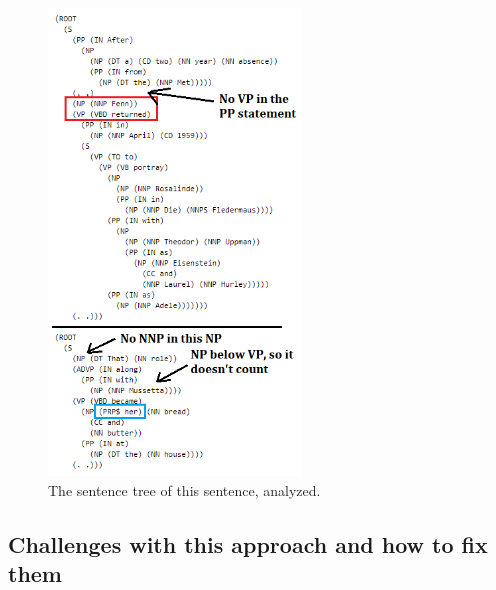\documentclass{article}
\begin{document}
\begin{figure}[H]
    \centering
\includegraphics[width=0.6\textwidth]{Example2.png}
    \caption{The sentence tree of this sentence, analyzed.}
\end{figure}

\subsection{Challenges with this approach and how to fix them}
\end{document}
